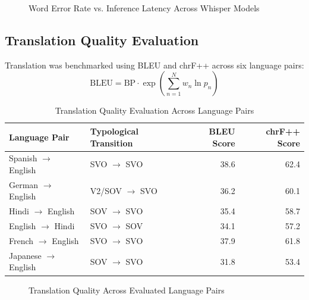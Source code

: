\documentclass[12pt,a4paper]{report}
\begin{document}
\begin{figure}[H]
  \centering
  \caption{Word Error Rate vs. Inference Latency Across Whisper Models}
  \label{fig:fig5_2}
\end{figure}

\subsection{Translation Quality Evaluation}
Translation was benchmarked using BLEU and chrF++ across six language pairs:
\begin{equation}
\text{BLEU} = \text{BP} \cdot \exp\left(\sum_{n=1}^N w_n \ln p_n\right)
\end{equation}

\begin{table}[H]
\centering
\small
\caption{Translation Quality Evaluation Across Language Pairs}
\label{tab:bleu_scores}
\begin{tabularx}{\textwidth}{lXrr}
\toprule
\textbf{Language Pair} & \textbf{Typological Transition} & \textbf{BLEU Score} & \textbf{chrF++ Score} \\
\midrule
Spanish $\rightarrow$ English & SVO $\rightarrow$ SVO & 38.6 & 62.4 \\
German $\rightarrow$ English & V2/SOV $\rightarrow$ SVO & 36.2 & 60.1 \\
Hindi $\rightarrow$ English & SOV $\rightarrow$ SVO & 35.4 & 58.7 \\
English $\rightarrow$ Hindi & SVO $\rightarrow$ SOV & 34.1 & 57.2 \\
French $\rightarrow$ English & SVO $\rightarrow$ SVO & 37.9 & 61.8 \\
Japanese $\rightarrow$ English & SOV $\rightarrow$ SVO & 31.8 & 53.4 \\
\bottomrule
\end{tabularx}
\end{table}

\begin{figure}[H]
  \centering
  \caption{Translation Quality Across Evaluated Language Pairs}
  \label{fig:fig5_3}
\end{figure}
\end{document}

